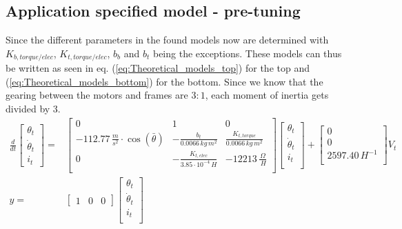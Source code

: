 \documentclass[../../main]{subfiles}
\begin{document}
\subsection{Application specified model - pre-tuning}
Since the different parameters in the found models now are determined with $K_{b,torque/elec}$, $K_{t,torque/elec}$, $b_b$ and $b_t$ being the exceptions. These models can thus be written as seen in eq. (\ref{eq:Theoretical_models_top}) for the top and (\ref{eq:Theoretical_models_bottom}) for the bottom. Since we know that the gearing between the motors and frames are $3:1$, each moment of inertia gets divided by 3.
\begin{equation}
      \label{eq:Theoretical_models_top}
      \begin{split}
      \frac{d}{dt}
          \begin{bmatrix}
              \theta_t \\
              \dot \theta_t \\
              i_t
          \end{bmatrix}
              =&
          \begin{bmatrix}
              0                                                   & 1                         & 0                             \\
              -112.77 \, \si{\frac{m}{s^2}} \cdot \cos(\bar \theta) & -\frac{b_t}{0.0066 \si{\,kg\,m^2} }  & \frac{K_{t,torque}}{0.0066 \si{\,kg\,m^2}} \\
              0    & -\frac{K_{t,elec}}{3.85\cdot 10^{-4}\si{\,H}}  & -12213 \si{\, \frac{\Omega}{\,H}}              \\
          \end{bmatrix}
          \begin{bmatrix}
              \theta_t      \\
              \dot \theta_t \\
              i_t           \\
          \end{bmatrix}
              +
          \begin{bmatrix}
              0             \\
              0             \\
              2597.40 \si{\,H^{-1}} \\
          \end{bmatrix}
              V_t
\\
          y =&
          \begin{bmatrix}
              1 & 0 & 0
          \end{bmatrix}
          \begin{bmatrix}
              \theta_t      \\
              \dot \theta_t \\
              i_t           \\
          \end{bmatrix}
    \end{split}
\end{equation}
\end{document}
